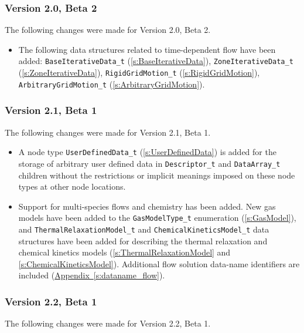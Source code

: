 \subsubsection{Version 2.0, Beta 2}
The following changes were made for Version 2.0, Beta 2.

\begin{itemize}
\item The following data structures related to time-dependent flow
      have been added:
      \texttt{BaseIterativeData\_t} (\autoref{s:BaseIterativeData}),
      \texttt{ZoneIterativeData\_t} (\autoref{s:ZoneIterativeData}),
      \texttt{RigidGridMotion\_t} (\autoref{s:RigidGridMotion}),
      \texttt{ArbitraryGridMotion\_t} (\autoref{s:ArbitraryGridMotion}).
\end{itemize}

\subsubsection{Version 2.1, Beta 1}
The following changes were made for Version 2.1, Beta 1.

\begin{itemize}
\item A node type
      \texttt{UserDefinedData\_t} (\autoref{s:UserDefinedData})
      is added for the storage of arbitrary user defined data in
      \texttt{Descriptor\_t} and \texttt{DataArray\_t} children without the
      restrictions or implicit meanings imposed on these node types at
      other node locations.
\item Support for multi-species flows and chemistry has been added.
      New gas models have been added to the \texttt{GasModelType\_t}
      enumeration (\autoref{s:GasModel}), and
      \texttt{ThermalRelaxationModel\_t} and \texttt{ChemicalKineticsModel\_t}
      data structures have been added for describing the 
      thermal relaxation and chemical kinetics models
      (\autoref{s:ThermalRelaxationModel} and
      \autoref{s:ChemicalKineticsModel}).
      Additional flow solution data-name identifiers are included
      (\hyperref[s:dataname_flow]{Appendix~\ref*{s:dataname_flow}}).
\end{itemize}

\subsubsection{Version 2.2, Beta 1}
The following changes were made for Version 2.2, Beta 1.

